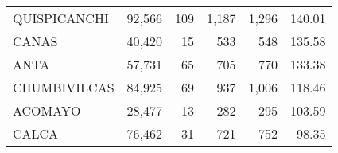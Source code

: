 \begin{tabular}{lrrrrr}
	\cellcolor[HTML]{FFFC9E}QUISPICANCHI                                               & 92,566                                                         & 109                                                      & 1,187                                                    & 1,296                                                               & 140.01                                                                       \\
	\cellcolor[HTML]{FFFC9E}CANAS                                                      & 40,420                                                         & 15                                                       & 533                                                      & 548                                                                 & 135.58                                                                       \\
	\cellcolor[HTML]{FFFC9E}ANTA                                                       & 57,731                                                         & 65                                                       & 705                                                      & 770                                                                 & 133.38                                                                       \\
	\cellcolor[HTML]{9AFF99}CHUMBIVILCAS                                               & 84,925                                                         & 69                                                       & 937                                                      & 1,006                                                               & 118.46                                                                       \\
	\cellcolor[HTML]{9AFF99}ACOMAYO                                                    & 28,477                                                         & 13                                                       & 282                                                      & 295                                                                 & 103.59                                                                       \\
	\cellcolor[HTML]{9AFF99}CALCA                                                      & 76,462                                                         & 31                                                       & 721                                                      & 752                                                                 & 98.35                                                                        \\

\end{tabular}

